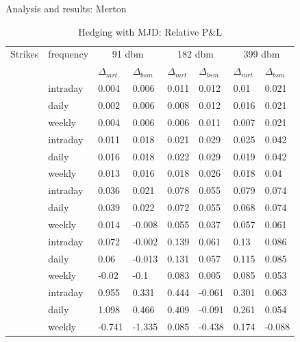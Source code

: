 \documentclass{beamer}
\begin{document}
\begin{frame}{Analysis and results: Merton}

  \begin{table}[h]
  \small
  \centering
  \begin{tabular}{llllllll}
    \hline
    \hline
   Strikes & frequency  &\multicolumn{2}{c}{91 dbm} & \multicolumn{2}{c}{182 dbm} & \multicolumn{2}{c}{399 dbm} \\ 
     &  & $\Delta_{mrt}$ & $\Delta_{bsm}$ & $\Delta_{mrt}$ & $\Delta_{bsm}$ & $\Delta_{mrt}$ & $\Delta_{bsm}$ \\ 
     \hdashline
    \multirow{3}{*}{140} & intraday & 0.004 & 0.006 & 0.011 & 0.012 & 0.01 & 0.021 \\ 
    & daily & 0.002 & 0.006 & 0.008 & 0.012 & 0.016 & 0.021 \\ 
    & weekly & 0.004 & 0.006 & 0.006 & 0.011 & 0.007 & 0.021 \\ 
     \hdashline
    \multirow{3}{*}{160} & intraday & 0.011 & 0.018 & 0.021 & 0.029 & 0.025 & 0.042 \\ 
    & daily & 0.016 & 0.018 & 0.022 & 0.029 & 0.019 & 0.042 \\ 
    & weekly & 0.013 & 0.016 & 0.018 & 0.026 & 0.018 & 0.04 \\ 
     \hdashline
    \multirow{3}{*}{186} & intraday & 0.036 & 0.021 & 0.078 & 0.055 & 0.079 & 0.074 \\ 
    & daily & 0.039 & 0.022 & 0.072 & 0.055 & 0.068 & 0.074 \\ 
    & weekly & 0.014 & -0.008 & 0.055 & 0.037 & 0.057 & 0.061 \\ 
     \hdashline
    \multirow{3}{*}{200} & intraday & 0.072 & -0.002 & 0.139 & 0.061 & 0.13 & 0.086 \\ 
    & daily & 0.06 & -0.013 & 0.131 & 0.057 & 0.115 & 0.085 \\ 
    & weekly & -0.02 & -0.1 & 0.083 & 0.005 & 0.085 & 0.053 \\ 
     \hdashline
    \multirow{3}{*}{230} & intraday & 0.955 & 0.331 & 0.444 & -0.061 & 0.301 & 0.063 \\ 
    & daily & 1.098 & 0.466 & 0.409 & -0.091 & 0.261 & 0.054 \\ 
    & weekly & -0.741 & -1.335 & 0.085 & -0.438 & 0.174 & -0.088 \\ 
     \hline
  \end{tabular}
  \caption{Hedging with MJD: Relative P\&L} 
  \label{t:analysis:merton:pl}
  \end{table}
   
\end{frame}
\end{document}

